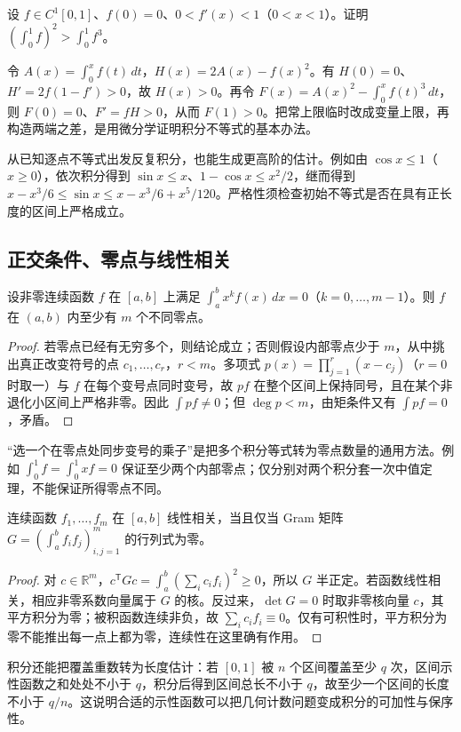 \begin{example}
设 $f\in C^1[0,1]$、$f(0)=0$、$0<f'(x)<1$（$0<x<1$）。证明 $\displaystyle\left(\int_0^1f\right)^2>\int_0^1f^3$。
\end{example}
\begin{solve}
令 $A(x)=\int_0^xf(t)\,dt$，$H(x)=2A(x)-f(x)^2$。有 $H(0)=0$、$H'=2f(1-f')>0$，故 $H(x)>0$。再令 $F(x)=A(x)^2-\int_0^xf(t)^3\,dt$，则 $F(0)=0$、$F'=fH>0$，从而 $F(1)>0$。把常上限临时改成变量上限，再构造两端之差，是用微分学证明积分不等式的基本办法。
\end{solve}
从已知逐点不等式出发反复积分，也能生成更高阶的估计。例如由 $\cos x\le1$（$x\ge0$），依次积分得到 $\sin x\le x$、$1-\cos x\le x^2/2$，继而得到 $x-x^3/6\le\sin x\le x-x^3/6+x^5/120$。严格性须检查初始不等式是否在具有正长度的区间上严格成立。

\subsection{正交条件、零点与线性相关}
\begin{proposition}
\label{prop:pei-int-moment-zeros}
设非零连续函数 $f$ 在 $[a,b]$ 上满足 $\int_a^bx^kf(x)\,dx=0$（$k=0,\ldots,m-1$）。则 $f$ 在 $(a,b)$ 内至少有 $m$ 个不同零点。
\end{proposition}
\begin{proof}
若零点已经有无穷多个，则结论成立；否则假设内部零点少于 $m$，从中挑出真正改变符号的点 $c_1,\ldots,c_r$，$r<m$。多项式 $p(x)=\prod_{j=1}^r(x-c_j)$（$r=0$ 时取一）与 $f$ 在每个变号点同时变号，故 $pf$ 在整个区间上保持同号，且在某个非退化小区间上严格非零。因此 $\int pf\ne0$；但 $\deg p<m$，由矩条件又有 $\int pf=0$，矛盾。
\end{proof}
“选一个在零点处同步变号的乘子”是把多个积分等式转为零点数量的通用方法。例如 $\int_0^1f=\int_0^1xf=0$ 保证至少两个内部零点；仅分别对两个积分套一次中值定理，不能保证所得零点不同。

\begin{proposition}
\label{prop:pei-int-gram}
连续函数 $f_1,\ldots,f_m$ 在 $[a,b]$ 线性相关，当且仅当 Gram 矩阵 $G=(\int_a^bf_i f_j)_{i,j=1}^m$ 的行列式为零。
\end{proposition}
\begin{proof}
对 $c\in\mathbb R^m$，$c^{\mathsf T}Gc=\int_a^b(\sum_i c_if_i)^2\ge0$，所以 $G$ 半正定。若函数线性相关，相应非零系数向量属于 $G$ 的核。反过来，$\det G=0$ 时取非零核向量 $c$，其平方积分为零；被积函数连续非负，故 $\sum_i c_if_i\equiv0$。仅有可积性时，平方积分为零不能推出每一点上都为零，连续性在这里确有作用。
\end{proof}
积分还能把覆盖重数转为长度估计：若 $[0,1]$ 被 $n$ 个区间覆盖至少 $q$ 次，区间示性函数之和处处不小于 $q$，积分后得到区间总长不小于 $q$，故至少一个区间的长度不小于 $q/n$。这说明合适的示性函数可以把几何计数问题变成积分的可加性与保序性。

